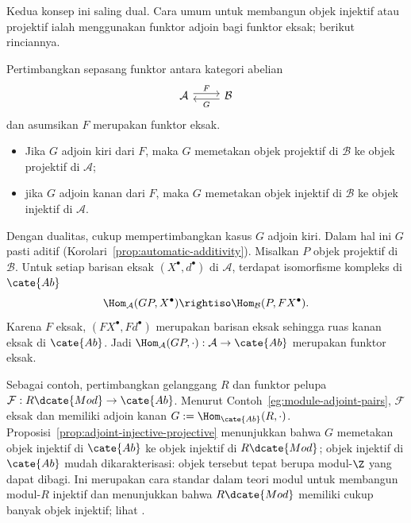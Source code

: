 Kedua konsep ini saling dual. Cara umum untuk membangun objek injektif atau
projektif ialah menggunakan funktor adjoin bagi funktor eksak; berikut rinciannya.

\begin{proposisi}\label{prop:adjoint-injective-projective}
Pertimbangkan sepasang funktor antara kategori abelian
\[\begin{tikzcd}
	\mathcal{A} \arrow[r, shift left, "F"] & \mathcal{B} \arrow[l, shift left, "G"]
\end{tikzcd}\]
dan asumsikan $F$ merupakan funktor eksak.
\begin{itemize}
	\item Jika $G$ adjoin kiri dari $F$, maka $G$ memetakan objek projektif di
	$\mathcal{B}$ ke objek projektif di $\mathcal{A}$;
	\item jika $G$ adjoin kanan dari $F$, maka $G$ memetakan objek injektif di
	$\mathcal{B}$ ke objek injektif di $\mathcal{A}$.
\end{itemize}
\end{proposisi}

\begin{bukti}
Dengan dualitas, cukup mempertimbangkan kasus $G$ adjoin kiri. Dalam hal ini
$G$ pasti aditif (Korolari~\ref{prop:automatic-additivity}). Misalkan $P$ objek
projektif di $\mathcal{B}$. Untuk setiap barisan eksak $(X^\bullet,d^\bullet)$
di $\mathcal{A}$, terdapat isomorfisme kompleks di $\cate{Ab}$
\[
\Hom_{\mathcal{A}}(GP,X^\bullet)\rightiso
\Hom_{\mathcal{B}}(P,FX^\bullet).
\]
Karena $F$ eksak, $(FX^\bullet,Fd^\bullet)$ merupakan barisan eksak sehingga
ruas kanan eksak di $\cate{Ab}$. Jadi
$\Hom_{\mathcal{A}}(GP,\cdot):\mathcal{A}\to\cate{Ab}$ merupakan funktor eksak.
\end{bukti}

Sebagai contoh, pertimbangkan gelanggang $R$ dan funktor pelupa
$\mathcal{F}:R\dcate{Mod}\to\cate{Ab}$. Menurut Contoh~\ref{eg:module-adjoint-pairs},
$\mathcal{F}$ eksak dan memiliki adjoin kanan
$G:=\Hom_{\cate{Ab}}(R,\cdot)$. Proposisi~\ref{prop:adjoint-injective-projective}
menunjukkan bahwa $G$ memetakan objek injektif di $\cate{Ab}$ ke objek injektif
di $R\dcate{Mod}$; objek injektif di $\cate{Ab}$ mudah dikarakterisasi: objek
tersebut tepat berupa modul-$\Z$ yang dapat dibagi. Ini merupakan cara standar dalam
teori modul untuk membangun modul-$R$ injektif dan menunjukkan bahwa
$R\dcate{Mod}$ memiliki cukup banyak objek injektif; lihat
\cite[Teorema 6.9.14]{Li1}.

